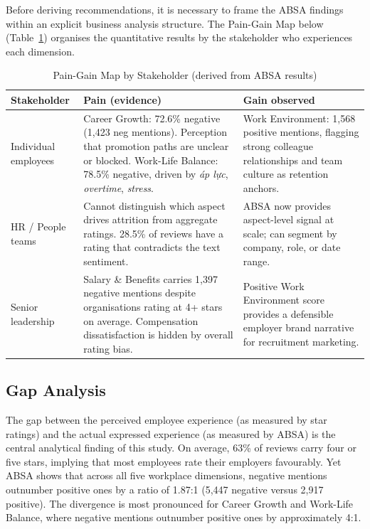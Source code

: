 \documentclass[12pt, a4paper]{article}
\begin{document}
Before deriving recommendations, it is necessary to frame the ABSA findings within an explicit business analysis structure. The Pain-Gain Map below (Table~\ref{tab:pain_gain}) organises the quantitative results by the stakeholder who experiences each dimension.

\begin{table}[H]
\centering
\caption{Pain-Gain Map by Stakeholder (derived from ABSA results)}
\label{tab:pain_gain}
\begin{tabular}{p{2.8cm} p{5.5cm} p{5cm}}
\toprule
\textbf{Stakeholder} & \textbf{Pain (evidence)} & \textbf{Gain observed} \\
\midrule
Individual employees & Career Growth: 72.6\% negative (1,423 neg mentions). Perception that promotion paths are unclear or blocked. Work-Life Balance: 78.5\% negative, driven by \textit{áp lực}, \textit{overtime}, \textit{stress}. & Work Environment: 1,568 positive mentions, flagging strong colleague relationships and team culture as retention anchors. \\
\addlinespace
HR / People teams & Cannot distinguish which aspect drives attrition from aggregate ratings. 28.5\% of reviews have a rating that contradicts the text sentiment. & ABSA now provides aspect-level signal at scale; can segment by company, role, or date range. \\
\addlinespace
Senior leadership & Salary \& Benefits carries 1,397 negative mentions despite organisations rating at 4+ stars on average. Compensation dissatisfaction is hidden by overall rating bias. & Positive Work Environment score provides a defensible employer brand narrative for recruitment marketing. \\
\bottomrule
\end{tabular}
\end{table}

\subsection{Gap Analysis}

The gap between the perceived employee experience (as measured by star ratings) and the actual expressed experience (as measured by ABSA) is the central analytical finding of this study. On average, 63\% of reviews carry four or five stars, implying that most employees rate their employers favourably. Yet ABSA shows that across all five workplace dimensions, negative mentions outnumber positive ones by a ratio of 1.87:1 (5,447 negative versus 2,917 positive). The divergence is most pronounced for Career Growth and Work-Life Balance, where negative mentions outnumber positive ones by approximately 4:1.
\end{document}
